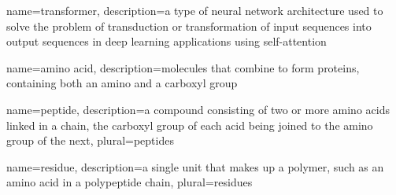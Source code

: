 \pagestyle{fancy}
\fancyhf{}
\renewcommand{\headrulewidth}{0pt}

{
name=transformer,
description={a type of neural network architecture used to solve the problem of transduction or transformation of input sequences into output sequences in deep learning applications using self-attention}
}

{
name=amino acid,
description={molecules that combine to form proteins, containing both an amino and a carboxyl group}
}

{
name=peptide,
description={a compound consisting of two or more amino acids linked in a chain, the carboxyl group of each acid being joined to the amino group of the next},
plural={peptides}
}

{
name=residue,
description={a single unit that makes up a polymer, such as an amino acid in a polypeptide chain},
plural={residues}
}

